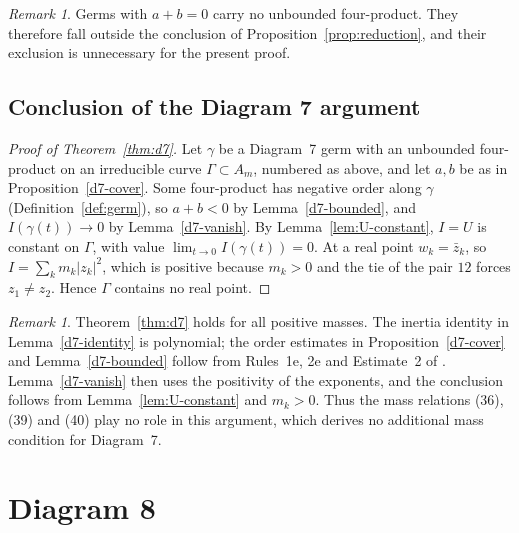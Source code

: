 \documentclass[11pt]{amsart}
\theoremstyle{definition}
\theoremstyle{remark}
\newtheorem{remark}[theorem]{Remark}
\begin{document}
\begin{remark}\label{d7-balanced}
Germs with $a+b=0$ carry no unbounded four-product.  They therefore fall outside
the conclusion of Proposition~\ref{prop:reduction}, and their exclusion is unnecessary
for the present proof.
\end{remark}

\subsection{Conclusion of the Diagram 7 argument}

\begin{proof}[Proof of Theorem~\ref{thm:d7}]
Let $\gamma$ be a Diagram~7 germ with an unbounded four-product on an irreducible curve
$\Gamma\subset A_m$, numbered as above, and let $a,b$ be as in Proposition~\ref{d7-cover}.  Some
four-product has negative order along $\gamma$ (Definition~\ref{def:germ}), so $a+b<0$ by
Lemma~\ref{d7-bounded}, and $I(\gamma(t))\to0$ by Lemma~\ref{d7-vanish}.  By
Lemma~\ref{lem:U-constant}, $I=U$ is constant on $\Gamma$, with value
$\lim_{t\to0}I(\gamma(t))=0$.  At a real point $w_k=\bar z_k$, so $I=\sum_km_k|z_k|^2$,
which is positive because $m_k>0$ and the tie of the pair $12$ forces $z_1\ne z_2$.  Hence
$\Gamma$ contains no real point.
\end{proof}

\begin{remark}\label{d7-masses}
Theorem~\ref{thm:d7} holds for all positive masses.  The inertia identity in
Lemma~\ref{d7-identity} is polynomial; the order estimates in
Proposition~\ref{d7-cover} and Lemma~\ref{d7-bounded} follow from Rules~1e, 2e and
Estimate~2 of \cite[\S3]{AK}.  Lemma~\ref{d7-vanish} then uses the positivity of the
exponents, and the conclusion follows from Lemma~\ref{lem:U-constant} and $m_k>0$.
Thus the mass relations (36), (39) and (40) play no role in this argument, which derives
no additional mass condition for Diagram~7.
\end{remark}



\section{Diagram 8}\label{sec:d8}
\end{document}
